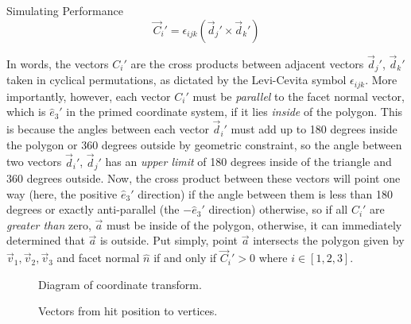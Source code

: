 \documentclass[oneside,12pt,final]{sty/ucthesis-CA2012}
\begin{document}
\begin{mainmatter}
\begin{section}{Simulating Performance}
\begin{equation}
    \vec{C}_{i}' = \epsilon_{ijk}(\vec{d}_{j}'\times\vec{d}_{k}')
\end{equation}

\noindent In words, the vectors $C_{i}'$ are the cross products between adjacent vectors $\vec{d}_{j}'$, $\vec{d}_{k}'$ taken in cyclical permutations, as dictated by the Levi-Cevita symbol $\epsilon_{ijk}$. More importantly, however, each vector $C_{i}'$ must be \textit{parallel} to the facet normal vector, which is $\hat{e}_{3}'$ in the primed coordinate system, if it lies \textit{inside} of the polygon. This is because the angles between each vector $\vec{d}_{i}'$ must add up to 180 degrees inside the polygon or 360 degrees outside by geometric constraint, so the angle between two vectors $\vec{d}_{i}'$, $\vec{d}_{j}'$ has an \textit{upper limit} of 180 degrees inside of the triangle and 360 degrees outside. Now, the cross product between these vectors will point one way (here, the positive $\hat{e}_3'$ direction) if the angle between them is less than 180 degrees or exactly anti-parallel (the $-\hat{e}_3'$ direction) otherwise, so if all $C_{i}'$ are \textit{greater than} zero, $\vec{a}$ must be inside of the polygon, otherwise, it can immediately determined that $\vec{a}$ is outside. Put simply, point $\vec{a}$ intersects the polygon given by $\vec{v}_1, \vec{v}_2, \vec{v}_3$ and facet normal $\hat{n}$ if and only if $\vec{C}_{i}' > 0$ where $i\in[1,2,3]$.

\begin{figure}[htb]
\label{fig:setup}
\begin{center}

\subfloat[Original]      {

}\quad
\subfloat[Primed]      {

}

\end{center}
\caption{Diagram of coordinate transform.}
\end{figure}

\begin{figure}[htb]
\label{fig:vectors}
\begin{center}

\subfloat[Inside]      {

}\quad
\subfloat[Outside]      {

}

\end{center}
\caption{Vectors from hit position to vertices.}
\end{figure}


\end{section}
\end{mainmatter}
\end{document}

